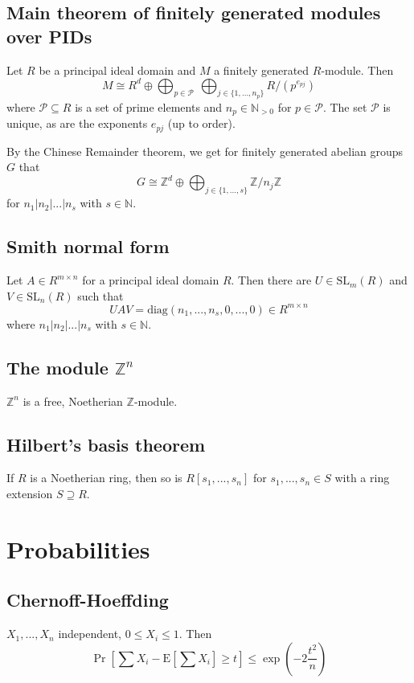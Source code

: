 \documentclass{scrartcl}
\newcommand{\Ex}{\mathrm{E}}
\newcommand{\N}{\mathbb{N}}
\newcommand{\Z}{\mathbb{Z}}
\begin{document}
\subsection{Main theorem of finitely generated modules over PIDs}
Let $R$ be a principal ideal domain and $M$ a finitely generated $R$-module. Then
\begin{equation*}
    M \cong R^d \oplus \bigoplus_{p \in \mathcal{P}} \ \bigoplus_{j \in \{1, ..., n_p\}} R / \left( p^{e_{pj}} \right)
\end{equation*}
where $\mathcal{P} \subseteq R$ is a set of prime elements and $n_p \in \N_{>0}$ for $p \in \mathcal{P}$. The set $\mathcal{P}$ is unique, as are the exponents $e_{pj}$ (up to order).

By the Chinese Remainder theorem, we get for finitely generated abelian groups $G$ that
\begin{equation*}
    G \cong \Z^d \oplus \bigoplus_{j \in \{1, ..., s\}} \Z/n_j\Z
\end{equation*}
for $n_1 | n_2 | ... | n_s$ with $s \in \N$.

\subsection{Smith normal form}
Let $A \in R^{m \times n}$ for a principal ideal domain $R$. Then there are $U \in \mathrm{SL}_m(R)$ and $V \in \mathrm{SL}_n(R)$ such that
\begin{equation*}
    U A V = \mathrm{diag}(n_1, ..., n_s, 0, ..., 0) \in R^{m \times n}
\end{equation*}
where $n_1 | n_2 | ... | n_s$ with $s \in \N$.

\subsection{The module $\Z^n$}
$\Z^n$ is a free, Noetherian $\Z$-module.

\subsection{Hilbert's basis theorem}
If $R$ is a Noetherian ring, then so is $R[s_1, ..., s_n]$ for $s_1, ..., s_n \in S$ with a ring extension $S \supseteq R$.

\section{Probabilities}

\subsection{Chernoff-Hoeffding}
$X_1, ..., X_n$ independent, $0 \leq X_i \leq 1$. Then
\begin{equation}
    \Pr\left[\sum X_i - \Ex\left[\sum X_i\right] \geq t\right] \leq \exp\left(-2\frac {t^2} n\right) \nonumber
\end{equation}
\end{document}
